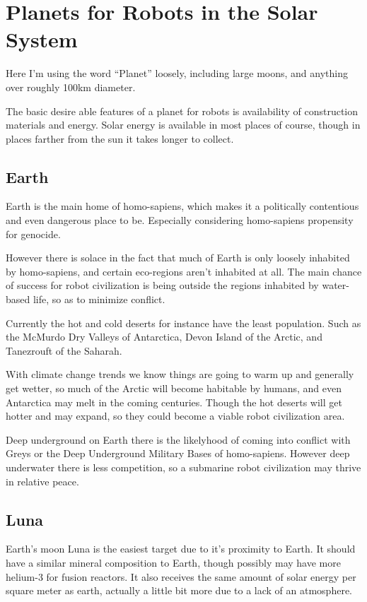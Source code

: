 \chapter{Planets for Robots in the Solar System}\label{robotPlanets}


Here I'm using the word ``Planet'' loosely, including large moons, and anything
over roughly 100km diameter. 

The basic desire able features of a planet for robots is availability of
construction materials and energy. Solar energy is available in most places of 
course, though in places farther from the sun it takes longer to collect. 


\section{Earth}

Earth is the main home of homo-sapiens, which makes it a politically
contentious and even dangerous place to be. Especially considering homo-sapiens
propensity for genocide.

However there is solace in the fact that much of Earth is only loosely inhabited
by homo-sapiens, and certain eco-regions aren't inhabited at all. The main
chance of success for robot civilization is being outside the regions inhabited
by water-based life, so as to minimize conflict. 

Currently the hot and cold deserts for instance have the least population. Such
as the McMurdo Dry Valleys of Antarctica,  Devon Island of the Arctic, and
Tanezrouft of the Saharah.  

With climate change trends we know things are going to warm up and generally get
wetter, so much of the Arctic will become habitable by humans, and even
Antarctica may melt in the coming centuries. Though the hot deserts will get
hotter and may expand, so they could become a viable robot civilization area. 

Deep underground on Earth there is the likelyhood of coming into conflict with 
Greys or the Deep Underground Military Bases of homo-sapiens.   However deep
underwater there is less competition, so a submarine robot civilization may
thrive in relative peace. 

\section{Luna}

Earth's moon Luna is the easiest target due to it's proximity to Earth. It
should have a similar mineral composition to Earth, though possibly may have
more helium-3 for fusion reactors. It also receives the same amount of solar 
energy per square meter as earth, actually a little bit more due to a lack of an
atmosphere. 

